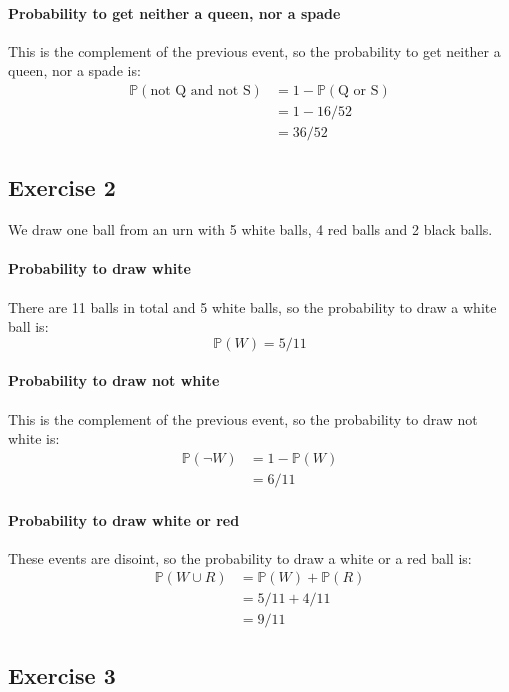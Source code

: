 \documentclass{article}
\newcommand{\1}{\mathbf{1}}
\renewcommand{\P}{\mathbb{P}}
\begin{document}
\paragraph{Probability to get neither a queen, nor a spade}
This is the complement of the previous event, so the probability to get neither a queen, nor a spade is:
\begin{align*}
  \P(\text{not Q and not S}) & = 1 - \P(\text{Q or S}) \\
                             & = 1 - 16/52             \\
                             & = 36/52
\end{align*}


\subsection{Exercise 2}
We draw one ball from an urn with 5 white balls, 4 red balls and 2 black balls.

\paragraph{Probability to draw white}
There are 11 balls in total and 5 white balls, so the probability to draw a white ball is:
$$\P(W) = 5/11$$

\paragraph{Probability to draw not white}
This is the complement of the previous event, so the probability to draw not white is:
\begin{align*}
  \P(\neg W)
   & = 1 - \P(W) \\
   & = 6/11
\end{align*}

\paragraph{Probability to draw white or red}
These events are disoint, so the probability to draw a white or a red ball is:
\begin{align*}
  \P(W \cup R)
   & = \P(W) + \P(R) \\
   & = 5/11 + 4/11   \\
   & = 9/11
\end{align*}

\subsection{Exercise 3}
\end{document}
